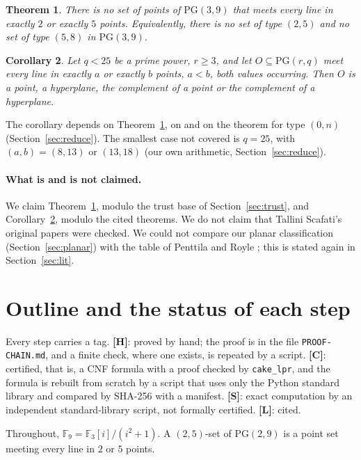 \documentclass[11pt]{article}
\theoremstyle{plain}
\newtheorem{theorem}{Theorem}
\newtheorem{corollary}[theorem]{Corollary}
\theoremstyle{remark}
\newcommand{\PG}{\mathrm{PG}}
\newcommand{\F}{\mathbb F}
\newcommand{\file}[1]{\texttt{#1}}
\begin{document}
\begin{theorem}\label{thm:main}
There is no set of points of $\PG(3,9)$ that meets every line in exactly $2$ or exactly $5$ points.
Equivalently, there is no set of type $(2,5)$ and no set of type $(5,8)$ in $\PG(3,9)$.
\end{theorem}

\begin{corollary}\label{cor:all}
Let $q<25$ be a prime power, $r\ge3$, and let $O\subseteq\PG(r,q)$ meet every line in exactly $a$ or exactly $b$ points, $a<b$, both values occurring.
Then $O$ is a point, a hyperplane, the complement of a point or the complement of a hyperplane.
\end{corollary}

The corollary depends on Theorem~\ref{thm:main}, on \cite[Theorem 12.5]{CK} and on the theorem for type $(0,n)$ (Section~\ref{sec:reduce}).
The smallest case not covered is $q=25$, with $(a,b)=(8,13)$ or $(13,18)$ (our own arithmetic, Section~\ref{sec:reduce}).

\paragraph{What is and is not claimed.}
We claim Theorem~\ref{thm:main}, modulo the trust base of Section~\ref{sec:trust}, and Corollary~\ref{cor:all}, modulo the cited theorems.
We do not claim that Tallini Scafati's original papers were checked.
We could not compare our planar classification (Section~\ref{sec:planar}) with the table of Penttila and Royle \cite{PR}; this is stated again in Section~\ref{sec:lit}.

\section{Outline and the status of each step}\label{sec:outline}

Every step carries a tag.
\textbf{[H]}: proved by hand; the proof is in the file \file{PROOF-CHAIN.md}, and a finite check, where one exists, is repeated by a script.
\textbf{[C]}: certified, that is, a CNF formula with a proof checked by \texttt{cake\_lpr}, and the formula is rebuilt from scratch by a script that uses only the Python standard library and compared by SHA-256 with a manifest.
\textbf{[S]}: exact computation by an independent standard-library script, not formally certified.
\textbf{[L]}: cited.

Throughout, $\F_9=\F_3[i]/(i^2+1)$.
A $(2,5)$-set of $\PG(2,9)$ is a point set meeting every line in $2$ or $5$ points.
\end{document}
